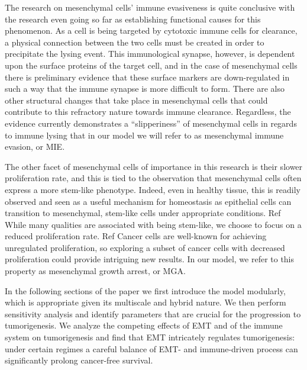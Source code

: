 \documentclass{article}
\begin{document}
The research on mesenchymal cells' immune evasiveness is quite conclusive with the research even going so far as establishing functional causes for this phenomenon.
As a cell is being targeted by cytotoxic immune cells for clearance, a physical connection between the two cells must be created in order to precipitate the lysing event.
This immunological synapse, however, is dependent upon the surface proteins of the target cell, and in the case of mesenchymal cells there is preliminary evidence that these surface markers are down-regulated in such a way that the immune synapse is more difficult to form\cite{terry2017new}.
There are also other structural changes that take place in mesenchymal cells that could contribute to this refractory nature towards immune clearance.
Regardless, the evidence currently demonstrates a ``slipperiness'' of mesenchymal cells in regards to immune lysing that in our model we will refer to as mesenchymal immune evasion, or MIE.

The other facet of mesenchymal cells of importance in this research is their slower proliferation rate, and this is tied to the observation that mesenchymal cells often express a more stem-like phenotype.
Indeed, even in healthy tissue, this is readily observed and seen as a useful mechanism for homeostasis as epithelial cells can transition to mesenchymal, stem-like cells under appropriate conditions. Ref
While many qualities are associated with being stem-like, we choose to focus on a reduced proliferation rate. Ref
Cancer cells are well-known for achieving unregulated proliferation, so exploring a subset of cancer cells with decreased proliferation could provide intriguing new results.
In our model, we refer to this property as mesenchymal growth arrest, or MGA.

In the following sections of the paper we first introduce the model modularly, which is appropriate given its multiscale and hybrid nature.
We then perform sensitivity analysis and identify parameters that are crucial for the progression to tumorigenesis.
We analyze the competing effects of EMT and of the immune system on tumorigenesis and find that EMT intricately regulates tumorigenesis: under certain regimes a careful balance of EMT- and immune-driven process can significantly prolong cancer-free survival.


\end{document}
